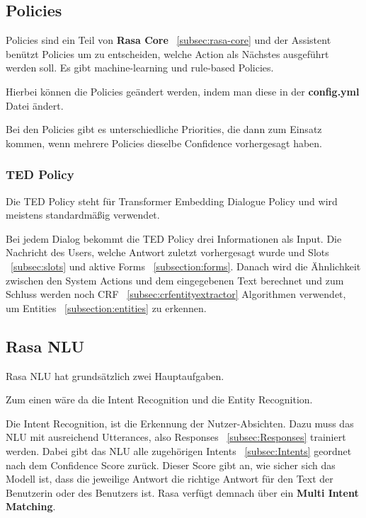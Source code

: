 \subsection{Policies}\label{subsec:policies}

Policies sind ein Teil von \textbf{Rasa Core} ~\ref{subsec:rasa-core} und der Assistent benützt Policies um zu entscheiden, welche Action als Nächstes ausgeführt werden soll.
Es gibt machine-learning und rule-based Policies.\cite{policies}

Hierbei können die Policies geändert werden, indem man diese in der \textbf{config.yml} Datei ändert.

Bei den Policies gibt es unterschiedliche Priorities, die dann zum Einsatz kommen, wenn mehrere Policies dieselbe Confidence vorhergesagt haben.\cite{policyPriority}

\subsubsection{TED Policy}

Die TED Policy steht für Transformer Embedding Dialogue Policy und wird meistens standardmäßig verwendet.\cite{tedPolicy}

Bei jedem Dialog bekommt die TED Policy drei Informationen als Input.
Die Nachricht des Users, welche Antwort zuletzt vorhergesagt wurde und Slots ~\ref{subsec:slots} und aktive Forms ~\ref{subsection:forms}.
Danach wird die Ähnlichkeit zwischen den System Actions und dem eingegebenen Text berechnet und zum Schluss werden noch CRF ~\ref{subsec:crfentityextractor} Algorithmen verwendet, um Entities ~\ref{subsection:entities} zu erkennen.\cite{tedPolicy}

\subsection{Rasa NLU}\label{subsec:rasa-nlu}

Rasa NLU hat grundsätzlich zwei Hauptaufgaben.

Zum einen wäre da die Intent Recognition und die Entity Recognition.\cite{rasanlu, pretrainedVsSupervised}

Die Intent Recognition, ist die Erkennung der Nutzer-Absichten.
Dazu muss das NLU mit ausreichend Utterances, also Responses ~\ref{subsec:Responses} trainiert werden.
Dabei gibt das NLU alle zugehörigen Intents ~\ref{subsec:Intents} geordnet nach dem Confidence Score zurück.
Dieser Score gibt an, wie sicher sich das Modell ist, dass die jeweilige Antwort die richtige Antwort für den Text der Benutzerin oder des Benutzers ist.
Rasa verfügt demnach über ein \textbf{Multi Intent Matching}.\cite{rasanlu, pretrainedVsSupervised}


